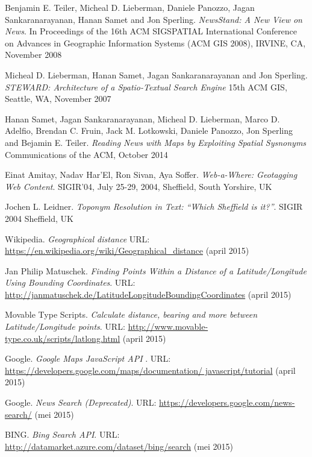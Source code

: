 \documentclass[twoside,openright]{uva-bachelor-thesis}
\begin{document}
\begin{thebibliography}{9}
	Benjamin E. Teiler, Micheal D. Lieberman, Daniele Panozzo, Jagan Sankaranarayanan, Hanan Samet and Jon Sperling.
	\textit{NewsStand: A New View on News}. 
	In Proceedings of the 16th ACM SIGSPATIAL International Conference on Advances in Geographic Information Systems (ACM GIS 2008), IRVINE, CA, November 2008
	
	Micheal D. Lieberman, Hanan Samet, Jagan Sankaranarayanan and Jon Sperling.
	\textit{STEWARD: Architecture of a Spatio-Textual Search Engine}
	15th ACM GIS, Seattle, WA, November 2007
	
	Hanan Samet, Jagan Sankaranarayanan, Micheal D. Lieberman, Marco D. Adelfio, Brendan C. Fruin, Jack M. Lotkowski, Daniele Panozzo, Jon Sperling and Bejamin E. Teiler.
	\textit{Reading News with Maps by Exploiting Spatial Sysnonyms}
	Communications of the ACM, October 2014
	
	Einat Amitay, Nadav Har'El, Ron Sivan, Aya Soffer.
	\textit{Web-a-Where: Geotagging Web Content}.
	SIGIR'04, July 25-29, 2004, Sheffield, South Yorshire, UK 
	
	Jochen L. Leidner.
	\textit{Toponym Resolution in Text: ``Which Sheffield is it?''}.
	SIGIR 2004 Sheffield, UK
	
	Wikipedia.
	\textit{Geographical distance}
	URL: \url{https://en.wikipedia.org/wiki/Geographical_distance}
	(april 2015)
	
	Jan Philip Matuschek. \textit{Finding Points Within a Distance of a Latitude/Longitude Using Bounding Coordinates}. 
	URL: \url{http://janmatuschek.de/LatitudeLongitudeBoundingCoordinates}
	(april 2015)
	
	Movable Type Scripts. \textit{Calculate distance, bearing and more between Latitude/Longitude points}. 
	URL: \url{http://www.movable-type.co.uk/scripts/latlong.html}
	(april 2015)
	
	Google. 
	\textit{Google Maps JavaScript API }. 
	URL: 
\url{	https://developers.google.com/maps/documentation/
	javascript/tutorial}
	(april 2015)
	
	Google.
	\textit{News Search (Deprecated)}.
	URL: \url{https://developers.google.com/news-search/}
	(mei 2015)
	
	BING. 
	\textit{Bing Search API}.
	URL: \url{http://datamarket.azure.com/dataset/bing/search}
	(mei 2015)
	

\end{thebibliography}
\end{document}

